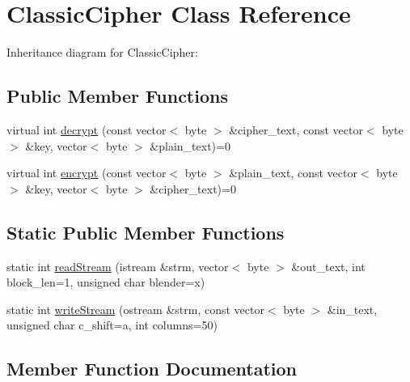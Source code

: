 \hypertarget{classClassicCipher}{}\section{Classic\+Cipher Class Reference}
\label{classClassicCipher}


Inheritance diagram for Classic\+Cipher\+:
\subsection*{Public Member Functions}
\begin{DoxyCompactItemize}
\item 
virtual int \hyperlink{classClassicCipher_a7a94b818759feeb570077022911d6648}{decrypt} (const vector$<$ byte $>$ \&cipher\+\_\+text, const vector$<$ byte $>$ \&key, vector$<$ byte $>$ \&plain\+\_\+text)=0
\item 
virtual int \hyperlink{classClassicCipher_aab1fac1b6e54aee2fb34a65cf4cb917f}{encrypt} (const vector$<$ byte $>$ \&plain\+\_\+text, const vector$<$ byte $>$ \&key, vector$<$ byte $>$ \&cipher\+\_\+text)=0
\end{DoxyCompactItemize}
\subsection*{Static Public Member Functions}
\begin{DoxyCompactItemize}
\item 
static int \hyperlink{classClassicCipher_aaa086df3339430db098d39e145da490d}{read\+Stream} (istream \&strm, vector$<$ byte $>$ \&out\+\_\+text, int block\+\_\+len=1, unsigned char blender=\textquotesingle{}x\textquotesingle{})
\item 
static int \hyperlink{classClassicCipher_ab3613bc81d24e8e2b5558851e3777746}{write\+Stream} (ostream \&strm, const vector$<$ byte $>$ \&in\+\_\+text, unsigned char c\+\_\+shift=\textquotesingle{}a\textquotesingle{}, int columns=50)
\end{DoxyCompactItemize}


\subsection{Member Function Documentation}
\mbox{\label{classClassicCipher_a7a94b818759feeb570077022911d6648}} 
